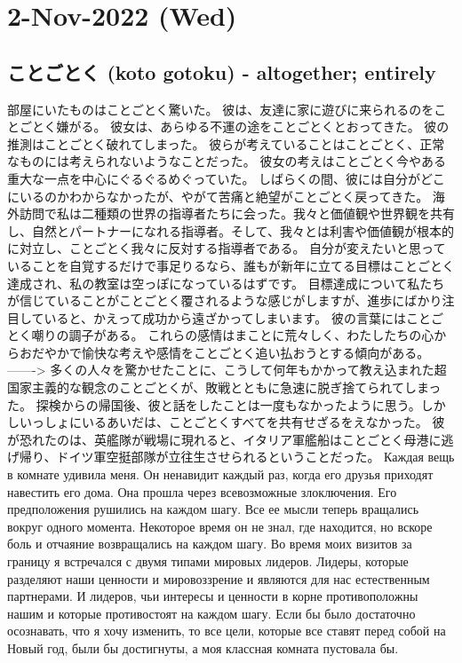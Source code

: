 \section{2-Nov-2022 (Wed)}
\subsection{ことごとく (koto gotoku) - altogether; entirely}

部屋にいたものはことごとく驚いた。
彼は、友達に家に遊びに来られるのをことごとく嫌がる。
彼女は、あらゆる不運の途をことごとくとおってきた。
彼の推測はことごとく破れてしまった。
彼らが考えていることはことごとく、正常なものには考えられないようなことだった。
彼女の考えはことごとく今やある重大な一点を中心にぐるぐるめぐっていた。
しばらくの間、彼には自分がどこにいるのかわからなかったが、やがて苦痛と絶望がことごとく戻ってきた。
海外訪問で私は二種類の世界の指導者たちに会った。我々と価値観や世界観を共有し、自然とパートナーになれる指導者。そして、我々とは利害や価値観が根本的に対立し、ことごとく我々に反対する指導者である。
自分が変えたいと思っていることを自覚するだけで事足りるなら、誰もが新年に立てる目標はことごとく達成され、私の教室は空っぽになっているはずです。
目標達成について私たちが信じていることがことごとく覆されるような感じがしますが、進歩にばかり注目していると、かえって成功から遠ざかってしまいます。
彼の言葉にはことごとく嘲りの調子がある。
これらの感情はまことに荒々しく、わたしたちの心からおだやかで愉快な考えや感情をことごとく追い払おうとする傾向がある。
-------> 多くの人々を驚かせたことに、こうして何年もかかって教え込まれた超国家主義的な観念のことごとくが、敗戦とともに急速に脱ぎ捨てられてしまった。
探検からの帰国後、彼と話をしたことは一度もなかったように思う。しかしいっしょにいるあいだは、ことごとくすべてを共有せざるをえなかった。
彼が恐れたのは、英艦隊が戦場に現れると、イタリア軍艦船はことごとく母港に逃げ帰り、ドイツ軍空挺部隊が立往生させられるということだった。
Каждая вещь в комнате удивила меня.
Он ненавидит каждый раз, когда его друзья приходят навестить его дома.
Она прошла через всевозможные злоключения.
Его предположения рушились на каждом шагу.
Все ее мысли теперь вращались вокруг одного момента.
Некоторое время он не знал, где находится, но вскоре боль и отчаяние возвращались на каждом шагу.
Во время моих визитов за границу я встречался с двумя типами мировых лидеров. Лидеры, которые разделяют наши ценности и мировоззрение и являются для нас естественным партнерами. И лидеров, чьи интересы и ценности в корне противоположны нашим и которые противостоят на каждом шагу.
Если бы было достаточно осознавать, что я хочу изменить, то все цели, которые все ставят перед собой на Новый год, были бы достигнуты, а моя классная комната пустовала бы.

